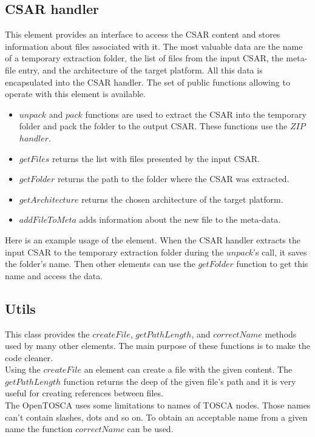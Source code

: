 \subsection*{CSAR handler}
This element provides an interface to access the CSAR content and stores information about files associated with it.
The most valuable data are the name of a temporary extraction folder, the list of files from the input CSAR, the meta-file entry, and the architecture of the target platform.
All this data is encapsulated into the CSAR handler.
The set of public functions allowing to operate with this element is available.
\begin{itemize}
	\item $unpack$ and $pack$ functions are used to extract the CSAR into the temporary folder and pack the folder to the output CSAR. 
	These functions use the $ZIP$~$handler$.
	\item $getFiles$ returns the list with files presented by the input CSAR.
	\item $getFolder$ returns the path to the folder where the CSAR was extracted.
	\item $getArchitecture$ returns the chosen architecture of the target platform.
	\item $addFileToMeta$ adds information about the new file to the meta-data.
\end{itemize}
Here is an example usage of the element.
When the CSAR handler extracts the input CSAR to the temporary extraction folder during the $unpack$'s call, it saves the folder's name. 
Then other elements can use the $getFolder$ function to get this name and access the data.

\subsection*{Utils}
This class provides the $createFile$, $getPathLength$, and $correctName$ methods used by many other elements.
The main purpose of these functions is to make the code cleaner. \\
Using the $createFile$ an element can create a file with the given content.
The $getPathLength$ function returns the deep of the given file's path and it is very useful for creating references between files.\\
The OpenTOSCA uses some limitations to names of TOSCA nodes. 
Those names can't contain slashes, dots and so on.
To obtain an acceptable name from a given name the function $correctName$ can be used.

